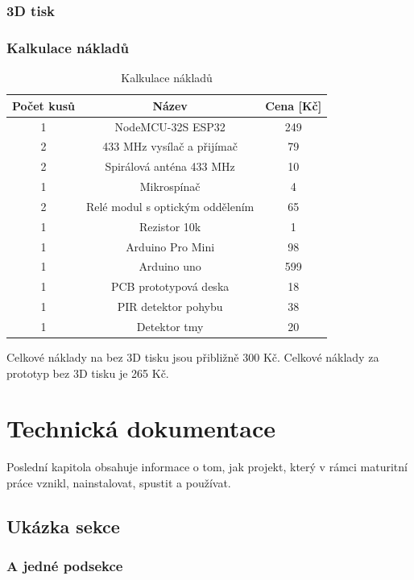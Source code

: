 \documentclass[11pt,a4paper,twoside,openright]{report}
\begin{document}
\subsection{3D tisk}


\subsection{Kalkulace nákladů}

\begin{table}[htb]
\centering
\begin{tabular}{|c|c|c|}
	\hline
	Počet kusů & Název & Cena [Kč] \\
	\hline
	1 & NodeMCU-32S ESP32 & 249  \\
	\hline
	2 & 433 MHz vysílač a přijímač & 79 \\
	\hline
	2 & Spirálová anténa 433 MHz & 10 \\
	\hline
	1 & Mikrospínač & 4 \\
	\hline
	2 & Relé modul s optickým oddělením & 65 \\
	\hline
	1 & Rezistor 10k & 1 \\
	\hline
	1 & Arduino Pro Mini & 98 \\
	\hline
	1 & Arduino uno & 599 \\
	\hline
	1 & PCB prototypová deska & 18 \\
	\hline
	1 & PIR detektor pohybu & 38 \\
	\hline
	1 & Detektor tmy & 20 \\
	\hline
\end{tabular}
\caption{Kalkulace nákladů}
\end{table}

Celkové náklady na  bez 3D tisku jsou přibližně 300 Kč.
Celkové náklady za prototyp  bez 3D tisku je 265 Kč.


\chapter{Technická dokumentace}

Poslední kapitola obsahuje informace o tom, jak projekt, který v rámci maturitní práce vznikl, nainstalovat, spustit a používat.

\section{Ukázka sekce}


\subsection{A jedné podsekce}
\end{document}

